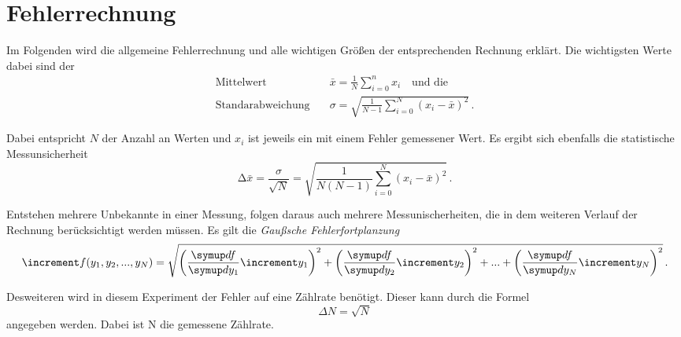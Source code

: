 \section{Fehlerrechnung}
\label{sec:Fehlerrechnung}

Im Folgenden wird die allgemeine Fehlerrechnung und alle wichtigen Größen der entsprechenden Rechnung erklärt.
Die wichtigsten Werte dabei sind der 
\begin{align}
    \text{Mittelwert} \quad & \bar{x}  = \frac{1}{N} \sum_{i=0}^{n} x_i \quad \text{und die} \label{eq:mittelwert} \\
    \text{Standarabweichung} \quad & \sigma  = \sqrt{\frac{1}{N - 1 } \sum_{i=0}^{N} (x_i -  \bar{x})^2} \, . \label{eq:standartabweichung}
\end{align}

Dabei entspricht $N$ der Anzahl an Werten und $x_i$ ist jeweils ein mit einem Fehler gemessener Wert.
Es ergibt sich ebenfalls die statistische Messunsicherheit
\begin{equation}
    \increment \bar{x} = \frac{\sigma}{\sqrt{N}} = 
    \sqrt{\frac{1}{N(N - 1)} \sum_{i=0}^{N} (x_i -  \bar{x})^2} \, . \label{eq:messunsicherheit}
\end{equation} 

Entstehen mehrere Unbekannte in einer Messung, folgen daraus auch mehrere Messunischerheiten,
die in dem weiteren Verlauf der Rechnung berücksichtigt werden müssen.
Es gilt die \textit{Gaußsche Fehlerfortplanzung}
\begin{equation}
    \increment f(y_1 ,y_2 ,...,y_N ) = \sqrt{\left(\frac{\dif{f}}{\dif{y_{1}}} \increment y_{1}\right)^2
    + \left(\frac{\dif{f}}{\dif{y_{2}}} \increment y_{2}\right)^2 + ... + 
    \left(\frac{\dif{f}}{\dif{y_{N}}} \increment y_{N}\right)^2
    } \, . \label{eq:fehlerfortplanzung}
\end{equation}

Desweiteren wird in diesem Experiment der Fehler auf eine Zählrate benötigt.
Dieser kann durch die Formel
\begin{equation}
    \Delta N = \sqrt{N}
\end{equation}
angegeben werden. Dabei ist N die gemessene Zählrate.